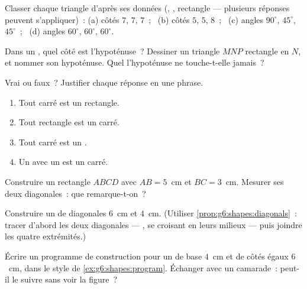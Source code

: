 \begin{exercise}[$\star$]\label{exo:g6:shapes:4}
Classer chaque triangle d'après ses données (, ,
rectangle --- plusieurs réponses peuvent s'appliquer)~:
(a) côtés $7$, $7$, $7$~; \
(b) côtés $5$, $5$, $8$~; \
(c) angles $90^\circ$, $45^\circ$, $45^\circ$~; \
(d) angles $60^\circ$, $60^\circ$, $60^\circ$.
\end{exercise}

\begin{exercise}[$\star$]\label{exo:g6:shapes:5}
Dans un , quel côté est l'hypoténuse~? Dessiner un
triangle $MNP$ rectangle en $N$, et nommer son hypoténuse. Quel 
l'hypoténuse ne touche-t-elle jamais~?
\end{exercise}

\begin{exercise}[$\star$]\label{exo:g6:shapes:6}
Vrai ou faux~? Justifier chaque réponse en une phrase.
\begin{enumerate}
  \item Tout carré est un rectangle.
  \item Tout rectangle est un carré.
  \item Tout carré est un .
  \item Un  avec un  est un carré.
\end{enumerate}
\end{exercise}

\begin{exercise}[$\star$]\label{exo:g6:shapes:7}
Construire un rectangle $ABCD$ avec $AB = 5$~cm et $BC = 3$~cm.
Mesurer ses deux diagonales~: que remarque-t-on~?
\end{exercise}

\begin{exercise}[$\star$]\label{exo:g6:shapes:8}
Construire un  de diagonales $6$~cm et $4$~cm. (Utiliser
\cref{prop:g6:shapes:diagonals}~: tracer d'abord les deux diagonales ---
\omterm{def:g6:lines:perp}{perpendiculaires}, se croisant en leurs milieux --- puis joindre les
quatre extrémités.)
\end{exercise}

\begin{exercise}[$\star\star$]\label{exo:g6:shapes:9}
Écrire un programme de construction pour un  de base
$4$~cm et de côtés égaux $6$~cm, dans le style de
\cref{ex:g6:shapes:program}. Échanger avec un camarade~: peut-il le
suivre sans voir la figure~?
\end{exercise}

